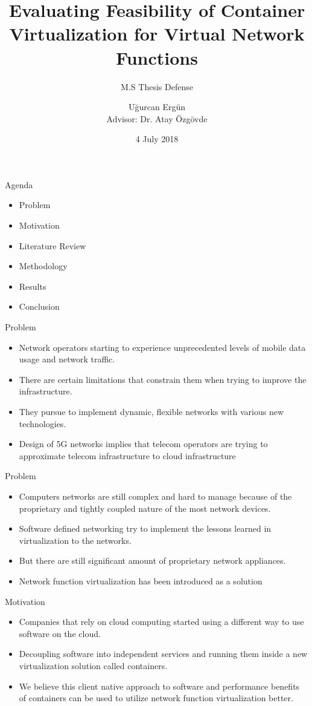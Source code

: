 \documentclass{beamer}
\title{Evaluating Feasibility of Container Virtualization for Virtual Network Functions}
\subtitle{M.S Thesis Defense}
\institute{Galatasaray University}
\author{Uğurcan Ergün \\ Advisor: Dr. Atay Özgövde}
\date{4 July 2018}
\begin{document}
\begin{frame}
  \titlepage
\end{frame}

\begin{frame}{Agenda}
 \begin{itemize}
  \item Problem
  \item Motivation
  \item Literature Review
  \item Methodology
  \item Results
  \item Conclusion
 \end{itemize}
\end{frame}

\begin{frame}{Problem}
 \begin{itemize}
  \item Network operators starting to experience unprecedented levels of mobile data usage and
network traffic.
 \item There are certain limitations that constrain them when trying to improve the infrastructure.
 \item They pursue to implement dynamic, flexible networks with various new technologies.
 \item Design of 5G networks implies that telecom operators are trying to approximate telecom
 infrastructure to cloud infrastructure
 \end{itemize}

\end{frame}

\begin{frame}{Problem}
 \begin{itemize}
  \item Computers networks are still complex and hard to manage because of the proprietary and tightly
coupled nature of the most network devices.
  \item Software defined networking try to implement the lessons learned in virtualization to the networks.
  \item But there are still significant amount of proprietary network appliances.
  \item Network function virtualization has been introduced as a solution
 \end{itemize}

\end{frame}

\begin{frame}{Motivation}
 \begin{itemize}
  \item Companies that rely on cloud computing started using a different way to use software on the cloud.
  \item Decoupling software into independent services and running them inside a new
  virtualization solution called containers.
  \item We believe this client native approach to software and performance benefits of containers can be used
  to utilize network function virtualization better.
 \end{itemize}

\end{frame}
\end{document}
